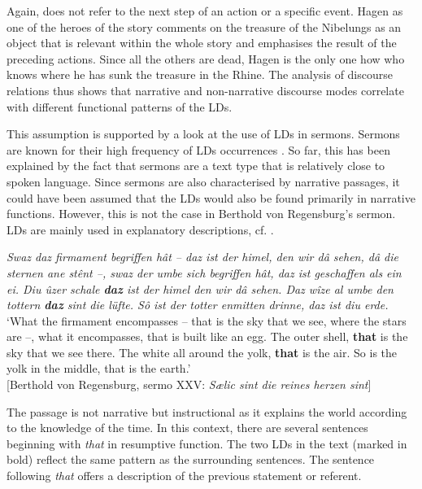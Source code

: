 \documentclass[output=paper,colorlinks,citecolor=brown]{langscibook}
\begin{document}
Again,  does not refer to the next step of an action or a specific event. Hagen as one of the heroes of the story comments on the treasure of the Nibelungs as an object that is relevant within the whole story and emphasises the result of the preceding actions. Since all the others are dead, Hagen is the only one how who knows where he has sunk the treasure in the Rhine. The analysis of discourse relations thus shows that narrative and non-narrative discourse modes correlate with different functional patterns of the LDs. 

This assumption is supported by a look at the use of LDs in sermons. Sermons are known for their high frequency of LDs occurrences \citep{Lötscher1994}. So far, this has been explained by the fact that sermons are a text type that is relatively close to spoken language. Since sermons are also characterised by narrative passages, it could have been assumed that the LDs would also be found primarily in narrative functions. However, this is not the case in Berthold von Regensburg's sermon. LDs are mainly used in explanatory descriptions, cf. .

\ea%
\label{ex:zeman:8}
{\itshape Swaz daz firmament begriffen hât – daz ist der himel, 
den wir dâ sehen, dâ die sternen ane stênt –, swaz der umbe sich begriffen hât, daz ist geschaffen als ein ei. Diu ûzer schale \textbf{daz} ist der himel den wir dâ sehen. Daz wîze al umbe den tottern \textbf{daz} sint die lüfte. Sô ist der totter enmitten drinne, daz ist diu erde.}\\
\glt ‘What the firmament encompasses – that is the sky that we see, where the stars are –, what it encompasses, that is built like an egg. The outer shell, \textbf{that} is the sky that we see there. The white all around the yolk, \textbf{that} is the air. So is the yolk in the middle, that is the earth.' \\ \hfill [Berthold von Regensburg, sermo XXV: \textit{Sælic sint die reines herzen sint}]\\
\z 

The passage is not narrative but instructional as it explains the world according to the knowledge of the time. In this context, there are several sentences beginning with \textit{that} in resumptive function. The two LDs in the text (marked in bold) reflect the same pattern as the surrounding sentences. The sentence following \textit{that} offers a description of the previous statement or referent.
\end{document}

